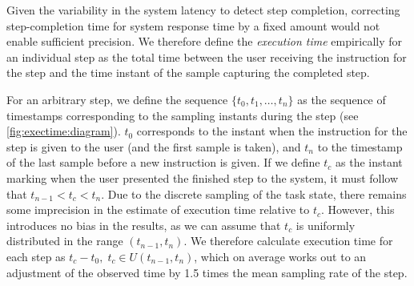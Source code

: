 \documentclass[10pt,letterpaper]{article}
\providecommand{\DIFaddtex}[1]{#1} %
\providecommand{\DIFdeltex}[1]{} %
\providecommand{\DIFaddbegin}{\protect\color{blue}} %
\providecommand{\DIFaddend}{\protect\color{black}} %
\providecommand{\DIFdelbegin}{\protect\color{red}} %
\providecommand{\DIFdelend}{\protect\color{black}} %
\providecommand{\DIFadd}[1]{\texorpdfstring{\DIFaddtex{#1}}{#1}} %
\providecommand{\DIFdel}[1]{\texorpdfstring{\DIFdeltex{#1}}{}} %
\newcommand{\DIFscaledelfig}{0.5}
\newlength{\DIFdelgraphicswidth} %
\newlength{\DIFdelgraphicsheight} %
\newcommand{\DIFaddincludegraphics}[2][]{{\color{blue}\fbox{\DIFOincludegraphics[#1]{#2}}}} %
\newcommand{\DIFdelincludegraphics}[2][]{%
\sbox{\DIFdelgraphicsbox}{\DIFOincludegraphics[#1]{#2}}%
\settoboxwidth{\DIFdelgraphicswidth}{\DIFdelgraphicsbox} %
\settoboxtotalheight{\DIFdelgraphicsheight}{\DIFdelgraphicsbox} %
\scalebox{\DIFscaledelfig}{%
\parbox[b]{\DIFdelgraphicswidth}{\usebox{\DIFdelgraphicsbox}\\[-\baselineskip] \rule{\DIFdelgraphicswidth}{0em}}\llap{\resizebox{\DIFdelgraphicswidth}{\DIFdelgraphicsheight}{%
\setlength{\unitlength}{\DIFdelgraphicswidth}%
\begin{picture}(1,1)%
\thicklines\linethickness{2pt} %
{\color[rgb]{1,0,0}\put(0,0){\framebox(1,1){}}}%
{\color[rgb]{1,0,0}\put(0,0){\line( 1,1){1}}}%
{\color[rgb]{1,0,0}\put(0,1){\line(1,-1){1}}}%
\end{picture}%
}\hspace*{3pt}}} %
} %
\DeclareRobustCommand{\DIFaddbegin}{\DIFOaddbegin \let\includegraphics\DIFaddincludegraphics} %
\DeclareRobustCommand{\DIFaddend}{\DIFOaddend \let\includegraphics\DIFOincludegraphics} %
\DeclareRobustCommand{\DIFdelbegin}{\DIFOdelbegin \let\includegraphics\DIFdelincludegraphics} %
\DeclareRobustCommand{\DIFdelend}{\DIFOaddend \let\includegraphics\DIFOincludegraphics} %
\begin{document}
\DIFdelbegin %
\DIFdelend %

Given the variability in the system latency to detect step completion, correcting step-completion time for system response time by a fixed amount would not enable sufficient precision.
We therefore \DIFdelbegin \DIFdel{estimated }\DIFdelend \DIFaddbegin \DIFadd{define }\DIFaddend the \emph{execution time} empirically for an individual step as the total time between the user receiving the instruction for \DIFdelbegin \DIFdel{a subtask and their presenting the completed subtask to the system.
}\DIFdelend \DIFaddbegin \DIFadd{the step and the time instant of the sample capturing the completed step.
}\DIFaddend 


\DIFdelbegin \DIFdel{Formally, for }\DIFdelend \DIFaddbegin \DIFadd{For }\DIFaddend an arbitrary step, we define the sequence \DIFdelbegin \DIFdel{\( S = \{ t_{0}, t_{1}, \ldots, t_{n} \} \) }\DIFdelend \DIFaddbegin \DIFadd{\( \{ t_{0}, t_{1}, \ldots, t_{n} \} \) }\DIFaddend as the sequence of timestamps corresponding to the sampling instants during the step \DIFaddbegin \DIFadd{(see \cref{fig:exectime:diagram})}\DIFaddend .
\( t_{0} \) corresponds \DIFdelbegin \DIFdel{then }\DIFdelend to the instant \DIFdelbegin \DIFdel{where }\DIFdelend \DIFaddbegin \DIFadd{when }\DIFaddend the instruction for the step is given to the user (and the first sample is taken), and \( t_{n} \) to the timestamp of the last sample before a new instruction is given\DIFdelbegin \DIFdel{(or conversely, the sample which captured the finished subtask as presented by the user)}\DIFdelend .
If we define \( t_{c} \) as the instant marking when the user \DIFdelbegin \DIFdel{finished and presented the task }\DIFdelend \DIFaddbegin \DIFadd{presented the finished step }\DIFaddend to the system, \DIFaddbegin \DIFadd{it must follow that }\DIFaddend \( t_{n-1} < t_{c} < t_{n} \)\DIFdelbegin \DIFdel{(see also \cref{fig:exectime:diagram})}\DIFdelend .
Due to the discrete sampling of the task state, there remains some imprecision in the estimate of execution time relative to \( t_{c} \).
However, this introduces no bias in the results, as we can \DIFdelbegin \DIFdel{infer }\DIFdelend \DIFaddbegin \DIFadd{assume }\DIFaddend that \( t_{c} \) is uniformly distributed in the range \( (t_{n-1}, t_{n}) \).
We therefore calculate execution time for each step as \( t_{c} - t_{0},\; t_{c} \in U(t_{n-1}, t_{n}) \), which on average works out to an adjustment of the observed time by 1.5 times the mean sampling rate of the step.
\DIFdelbegin \DIFdel{This is also aggregated into an average at the block level.
}\DIFdelend %
\end{document}
